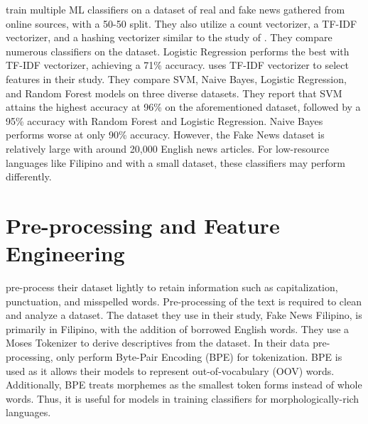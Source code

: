  train multiple ML classifiers on a dataset of real and fake news gathered from online sources, with a 50-50 split. They also utilize a count vectorizer, a TF-IDF vectorizer, and a hashing vectorizer similar to the study of . They compare numerous classifiers on the dataset. Logistic Regression performs the best with TF-IDF vectorizer, achieving a 71\% accuracy.  uses TF-IDF vectorizer to select features in their study. They compare SVM, Naive Bayes, Logistic Regression, and Random Forest models on three diverse datasets. They report that SVM attains the highest accuracy at 96\% on the aforementioned dataset, followed by a 95\% accuracy with Random Forest and Logistic Regression. Naive Bayes performs worse at only 90\% accuracy. However, the Fake News dataset is relatively large with around 20,000 English news articles. For low-resource languages like Filipino and with a small dataset, these classifiers may perform differently.

\section{Pre-processing and Feature Engineering}

 pre-process their dataset lightly to retain information such as capitalization, punctuation, and misspelled words. Pre-processing of the text is required to clean and analyze a dataset. The dataset they use in their study, Fake News Filipino, is primarily in Filipino, with the addition of borrowed English words.  They use a Moses Tokenizer to derive descriptives from the dataset. In their data pre-processing,  only perform Byte-Pair Encoding (BPE) for tokenization. BPE is used as it allows their models to represent out-of-vocabulary (OOV) words. Additionally, BPE treats morphemes as the smallest token forms instead of whole words. Thus, it is useful for models in training classifiers for morphologically-rich languages.

